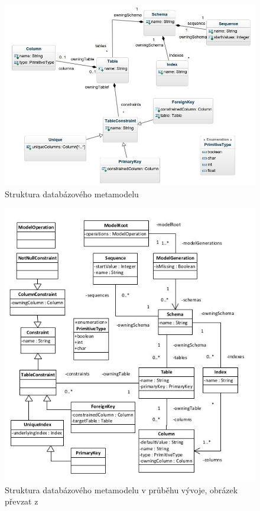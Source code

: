 \documentclass[11pt,twoside,a4paper]{book}
\begin{document}
\begin{figure}[ht]
\begin{center}
\includegraphics[width=15cm]{figures/rdb_structure}
\caption{Struktura databázového metamodelu}
\label{fig:rdb_str}
\end{center}
\end{figure}

\begin{figure}[ht]
\begin{center}
\includegraphics[width=15cm]{figures/rdb_structure_tarant}
\caption{Struktura databázového metamodelu v průběhu vývoje, obrázek převzat z
\cite{Tarant_bp}}
\label{fig:rdb_str_tarant}
\end{center}
\end{figure}
\end{document}
